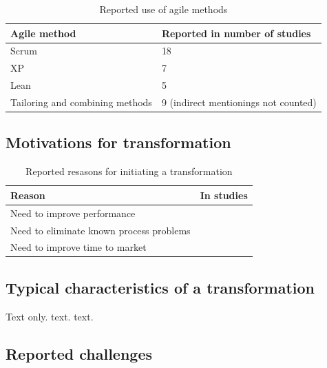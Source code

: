 \documentclass[lnbip]{svmultln}
\begin{document}
\begin{table}[h]
    \begin{tabular}{ l@{ \hskip 0.4cm } l }
        \toprule
        Agile method    & Reported in number of studies   \\ \midrule
        Scrum           & 18 \\ 
        XP              & 7 \\
        Lean            & 5 \\
        Tailoring and combining methods & 9  (indirect mentionings not counted) \\
        \bottomrule
    \end{tabular}
    \caption{Reported use of agile methods}
    \label{table:practices}
\end{table}


\subsection{Motivations for transformation}

\begin{table}[h]
    \begin{tabular}{ l@{ \hskip 0.4cm } l }
        \toprule
        Reason                                    & In studies   \\ \midrule
        Need to improve performance               &  \\ 
        Need to eliminate known process problems  &  \\
        Need to improve time to market            &  \\
        \bottomrule
    \end{tabular}
    \caption{Reported resasons for initiating a transformation}
    \label{table:motivations}
\end{table}


\subsection{Typical characteristics of a transformation}

Text only. text. text.


\subsection{Reported challenges}
\end{document}
